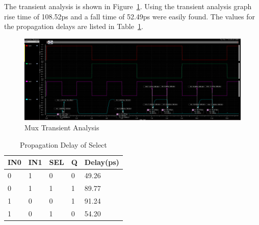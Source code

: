 \documentclass[12pt]{article}
\begin{document}
The transient analysis is shown in Figure~\ref{fig:transient}. Using the transient analysis graph
rise time of 108.52ps and a fall time of 52.49ps were easily found. 
The values for the propagation delays are listed in Table~\ref{table:results}.
\begin{figure}[!htb]
  \centering
  \includegraphics[width=5in]{figures/transient.png}
  \caption{Mux Transient Analysis}\label{fig:transient}
\end{figure}
\begin{table}[!htb]
  \centering
  \caption{Propagation Delay of Select}\label{table:results}
  \begin{tabular}{ |l|l|l|l|l| }
    \hline
    IN0 & IN1 & SEL & Q & Delay(ps) \\
    \hline
    0 & 1 & 0 & 0 & 49.26 \\
    0 & 1 & 1 & 1 & 89.77 \\
    1 & 0 & 0 & 1 & 91.24 \\
    1 & 0 & 1 & 0 & 54.20 \\
    \hline
  \end{tabular}
\end{table}
\end{document}
